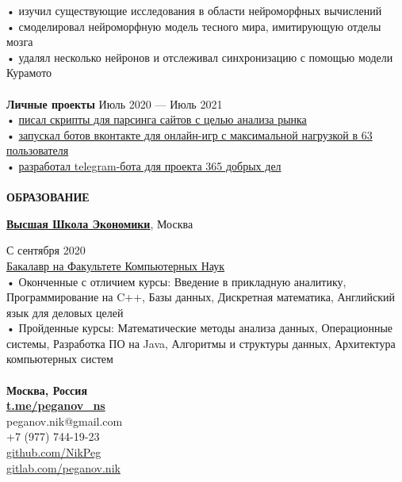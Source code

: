 \documentclass{article}
\begin{document}
\begin{vwcol}[widths={0.8,0.2},
 sep=.8cm, justify=flush,rule=0pt,indent=1em]
• изучил существующие исследования в области нейроморфных вычислений\\
• смоделировал нейроморфную модель тесного мира, имитирующую отделы мозга\\
• удалял несколько нейронов и отслеживал синхронизацию с помощью модели Курамото\\
\\
\textbf{\Large{Личные проекты}}
\hspace{190pt}Июль 2020 — Июль 2021\\ 
• \href{https://github.com/NikPeg/OzonParsing}{писал скрипты для парсинга сайтов с целью анализа рынка}\\
• \href{https://github.com/NikPeg/ExtraterrestrialBot}{запускал ботов вконтакте для онлайн-игр с максимальной нагрузкой в 63 пользователя}\\
• \href{https://github.com/NikPeg/dobrobot365}{разработал telegram-бота для проекта 365 добрых дел}\\
\\
\noindent\textcolor[rgb]{0.1255,0.2902,0.7843}{\textbf{\Large{ОБРАЗОВАНИЕ}}}\\
\begin{Large}
\textbf{\href{https://hse.ru/}{Высшая Школа Экономики}}, Москва
\end{Large}
\hspace{90pt}С сентября 2020\\
\href{https://cs.hse.ru/}{Бакалавр на Факультете Компьютерных Наук}\\
• Оконченные с отличием курсы: Введение в прикладную аналитику, Программирование на C++,  Базы данных, Дискретная математика, Английский язык для деловых целей\\
• Пройденные курсы: Математические методы анализа данных, Операционные системы, Разработка ПО на Java, Алгоритмы и структуры данных, Архитектура компьютерных систем\\
\newpage
~\\
\noindent\textbf{Москва, Россия}\\
\noindent\textbf{\textcolor[rgb]{0.1255,0.2902,0.7843}{\href{https://t.me/peganov\_ns}{t.me/peganov\_ns}}}\\
peganov.nik@gmail.com\\
+7 (977) 744-19-23\\
\href{https://github.com/NikPeg}{github.com/NikPeg}\\
\href{https://gitlab.com/peganov.nik}{gitlab.com/peganov.nik}\\
\\

\end{vwcol}
\end{document}
